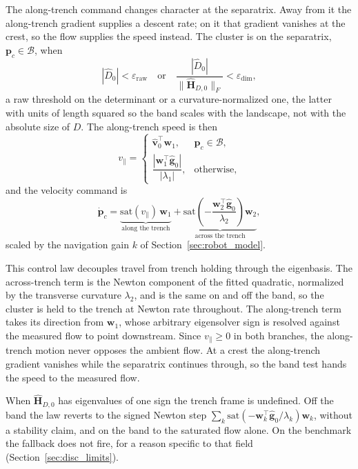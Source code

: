 \documentclass[lettersize,journal]{IEEEtran}
\begin{document}
The along-trench command changes character at the separatrix. Away from
it the along-trench gradient supplies a descent rate; on it that
gradient vanishes at the crest, so the flow supplies the speed instead.
The cluster is on the separatrix, $\mathbf{p}_c \in \mathcal{B}$, when
\begin{equation}
    |\hat{D}_0| < \varepsilon_{\mathrm{raw}}
    \quad\text{or}\quad
    \frac{|\hat{D}_0|}{\|\hat{\mathbf{H}}_{D,0}\|_F}
        < \varepsilon_{\dim},
\end{equation}
a raw threshold on the determinant or a curvature-normalized one, the
latter with units of length squared so the band scales with the
landscape, not with the absolute size of $D$. The along-trench
speed is then
\begin{equation}
    v_\parallel =
    \begin{cases}
        \hat{\mathbf{v}}_0^\top \mathbf{w}_1,
            & \mathbf{p}_c \in \mathcal{B}, \\[6pt]
        \dfrac{|\mathbf{w}_1^\top \hat{\mathbf{g}}_0|}{|\lambda_1|},
            & \text{otherwise},
    \end{cases}
    \label{eq:vpar}
\end{equation}
and the velocity command is
\begin{equation}
    \dot{\mathbf{p}}_c =
    \underbrace{\mathrm{sat}(v_\parallel)\,\mathbf{w}_1}_{\text{along the trench}}
    + \underbrace{\mathrm{sat}\!\left(-\frac{\mathbf{w}_2^\top
      \hat{\mathbf{g}}_0}{\lambda_2}\right)\mathbf{w}_2}_{\text{across the trench}},
    \label{eq:d_law}
\end{equation}
scaled by the navigation gain $k$ of Section~\ref{sec:robot_model}.

This control law decouples travel from trench holding through the
eigenbasis.
The across-trench term is the Newton component of the fitted quadratic,
normalized by the transverse curvature $\lambda_2$, and is the same
on and off the band, so the cluster is held to the trench at Newton rate
throughout. The along-trench term takes its direction from
$\mathbf{w}_1$, whose arbitrary eigensolver sign is
resolved against the measured flow to point downstream. Since
$v_\parallel \geq 0$ in both branches, the
along-trench motion never opposes the ambient flow. At a
crest the along-trench gradient vanishes while the separatrix continues
through, so the band test hands the speed to the measured flow.

When $\hat{\mathbf{H}}_{D,0}$ has eigenvalues of one sign the trench
frame is undefined. Off the band the law reverts to the signed Newton
step $\sum_k \mathrm{sat}(-\mathbf{w}_k^\top\hat{\mathbf{g}}_0/
\lambda_k)\mathbf{w}_k$, without a stability claim, and on the band to
the saturated flow alone. On the benchmark the fallback does not fire,
for a reason specific to that field (Section~\ref{sec:disc_limits}).
\end{document}
